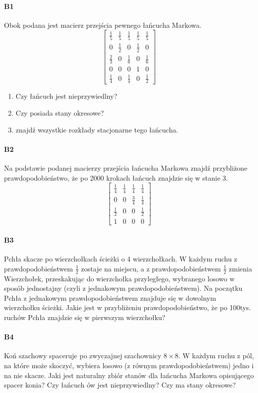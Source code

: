 \documentclass[a4paper,12pt]{article}
\theoremstyle{definition}%
\theoremstyle{definition}
\theoremstyle{problem}
\begin{document}
\paragraph{B1} Obok podana jest macierz przejścia pewnego łańcucha Markowa.
$$\begin{bmatrix}
\frac{1}{5}&\frac{1}{5}&\frac{1}{5}&\frac{1}{5}&\frac{1}{5}\\
0&\frac{1}{2}&0&\frac{1}{2}&0\\
\frac{2}{3}&0&\frac{1}{6}&0&\frac{1}{6}\\
0&0&0&1&0\\
\frac{1}{4}&0&\frac{1}{4}&0&\frac{1}{2}
\end{bmatrix}$$
\begin{enumerate}[label=\alph*)]
\item Czy łańcuch jest nieprzywiedlny?
\item Czy posiada stany okresowe?
\item znajdź wszystkie rozkłady stacjonarne tego łańcucha.
\end{enumerate}

\paragraph{B2} Na podstawie podanej macierzy przejścia łańcucha Markowa znajdź przybliżone
prawdopodobieństwo, że po 2000 krokach łańcuch znajdzie się w stanie 3.
$$\begin{bmatrix}
\frac{1}{4}&\frac{1}{4}&\frac{1}{4}&\frac{1}{4}\\
0&0&\frac{3}{4}&\frac{1}{4}\\
\frac{1}{2}&0&0&\frac{1}{2}\\
1&0&0&0
\end{bmatrix}$$

\paragraph{B3} Pchła skacze po wierzchołkach ścieżki o 4 wierzchołkach. W każdym ruchu z prawdopodobieństwem $\frac{1}{2}$ zostaje na miejscu, a z prawdopodobieństwem $\frac{1}{2}$ zmienia Wierzchołek, przeskakując do wierzchołka przyległego, wybranego losowo w sposób jednostajny (czyli z jednakowym prawdopodobieństwem). Na początku Pchła z jednakowym prawdopodobieństwem znajduje się w dowolnym wierzchołku ścieżki. Jakie jest w przybliżeniu prawdopodobieństwo, że po 100tys. ruchów Pchła znajdzie się w pierwszym wierzchołku?

\paragraph{B4} Koń szachowy spaceruje po zwyczajnej szachownicy $8\times 8$. W każdym ruchu z pól, na które może skoczyć, wybiera losowo (z równym prawdopodobieństwem) jedno i na nie skacze. Jaki jest naturalny zbiór stanów dla łańcucha Markowa opisującego spacer konia? Czy łańcuch ów jest nieprzywiedlny? Czy ma stany okresowe?
\end{document}
